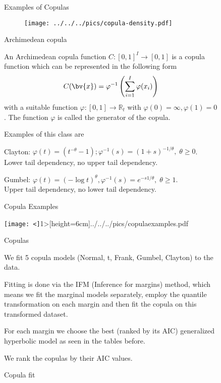 \begin{figure}[htp]
Examples of Copulas

\begin{center}
\begin{figure}
\texttt{[image: ../../../pics/copula-density.pdf]} 
\end{figure}

\par\end{center}



Archimedean copula

An Archimedean copula function $C:[0,1]^{I}\rightarrow[0,1]$ is a
copula function which can be represented in the following form 
$$
C(\bv{x})=\varphi^{-1}\left(\sum_{i=1}^{I}\varphi(x_{i})\right)
$$
with a suitable function $\varphi:[0,1]\rightarrow\mathbb{R}_{t}$
with $\varphi(0)=\infty,\varphi(1)=0$. The function $\varphi$ is
called the generator of the copula.

Examples of this class are 

Clayton: $\varphi(t)=(t^{-\theta}-1);\varphi^{-1}(s)=(1+s)^{-1/\theta},\;\theta\geq0$.\\
 Lower tail dependency, no upper tail dependency. 

Gumbel: $\varphi(t)=(-\log t)^{\theta},\varphi^{-1}(s)=e^{-s1/\theta},\;\theta\geq1$.\\
 Upper tail dependency, no lower tail dependency. 



 Copula Examples

\texttt{[image: <]}1>{[}height=6cm{]}../../../pics/copulaexamples.pdf



Copulas

We fit 5 copula models (Normal, t, Frank, Gumbel, Clayton) to the
data. 

Fitting is done via the IFM (Inference for margins) method, which
means we fit the marginal models separately, employ the quantile transformation
on each margin and then fit the copula on this transformed dataset. 

For each margin we choose the best (ranked by its AIC) generalized
hyperbolic model as seen in the tables before. 

We rank the copulas by their AIC values.



Copula fit

\begin{table}[ht]
\vspace{0.5cm}
 


\end{table}
\end{figure}
